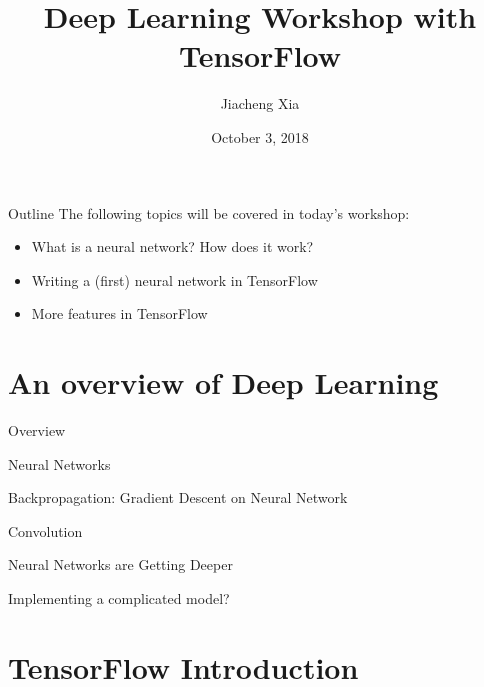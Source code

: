 \documentclass{beamer}
\title[MSBD 5001 TensorFlow Workshop]{Deep Learning Workshop with TensorFlow}
\author[Jiacheng Xia, jxiaab\{at\}cse.ust.hk]{Jiacheng Xia}
\date{October 3, 2018}
\begin{document}
\AtBeginSection[]
{
  \begin{frame}
    \tableofcontents[currentsection]
  \end{frame}
}
\maketitle

\begin{frame}{Outline}
    The following topics will be covered in today's workshop:
    \begin{itemize}
        \item What is a neural network? How does it work?
        \item Writing a (first) neural network in TensorFlow
        \item More features in TensorFlow
    \end{itemize}
\end{frame}

\section{An overview of Deep Learning}

\begin{frame}{Overview}
    
\end{frame}

\begin{frame}{Neural Networks}

\end{frame}

\begin{frame}{Backpropagation: Gradient Descent on Neural Network}
    
\end{frame}

\begin{frame}{Convolution}
    
\end{frame}

\begin{frame}{Neural Networks are Getting Deeper}
    
\end{frame}

\begin{frame}{Implementing a complicated model?}
    
\end{frame}

\section{TensorFlow Introduction}
\end{document}
